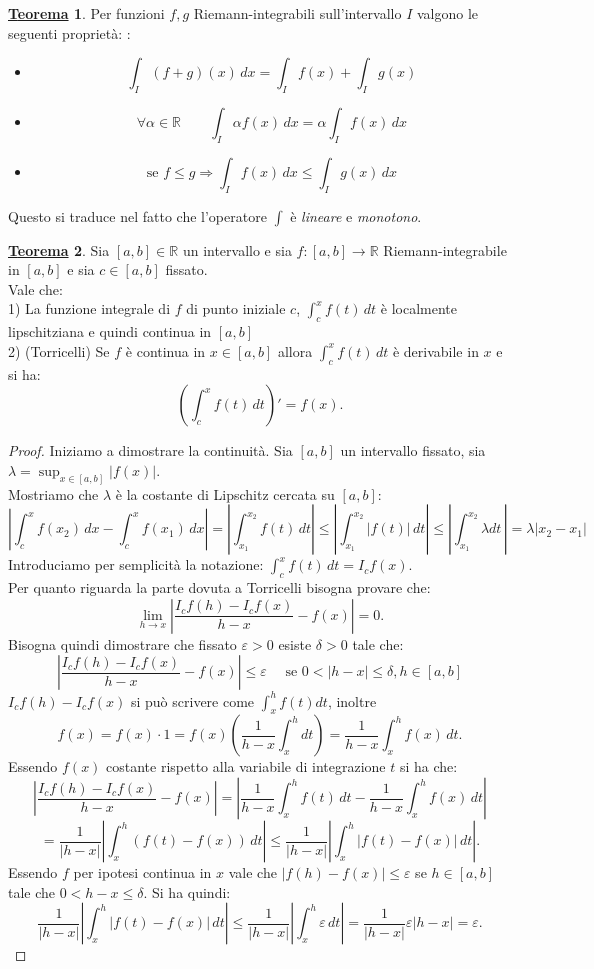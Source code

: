 \documentclass[a4paper,twoside]{article}
\renewcommand{\epsilon}{\varepsilon}
\newcommand{\R}{\mathbb{R}}
\theoremstyle{definition}
\newtheorem{theorem}{\color{Red}\underline{\textrm Teorema}}
\numberwithin{theorem}{section}
\begin{document}
\begin{theorem} 
Per funzioni $f,g$ Riemann-integrabili sull'intervallo $I$ valgono le seguenti proprietà:
:
\begin{itemize}
    \item $$\int_{I} (f+g)(x)\,dx = \int_{I} f(x) + \int_{I} g(x)$$
    \item $$\forall\alpha\in\R\qquad \int_{I} \alpha f(x)\,dx =\alpha\int_{I} f(x)\,dx$$
    \item $$\text{se } f\leq g \Rightarrow \int_{I}f(x)\,dx \leq \int_{I}g(x)\,dx$$
\end{itemize}
Questo si traduce nel fatto che l'operatore $\int$ è \emph{lineare} e \emph{monotono}.
\end{theorem}
\begin{theorem}
    Sia $[a,b]\in\R$ un intervallo e sia $f:[a,b]\to\R$ Riemann-integrabile in $[a,b]$ e sia $c\in[a,b]$ fissato.\\ Vale che:\\
    1) La funzione integrale di $f$ di punto iniziale $c$, $\int_c^x f(t)\,dt$ è localmente lipschitziana e quindi continua in $[a,b]$ \\
    2) (Torricelli) Se $f$ è continua in $x\in[a,b]$ allora $\int_c^x f(t)\,dt$ è derivabile in $x$ e si ha: $$\left(\int_c^x f(t)\,dt\right)' =f(x).$$
\end{theorem}
\begin{proof}
    Iniziamo a dimostrare la continuità. Sia $[a,b]$ un intervallo fissato, sia $\lambda=\sup_{x\in[a,b]}|f(x)|$.\\ Mostriamo che $\lambda$ è la costante di Lipschitz cercata su $[a,b]$:
    $$\left|\int_c^xf(x_2)\,dx-\int_c^xf(x_1)\,dx\right|=\left|\int_{x_1}^{x_2}f(t)\,dt\right|\leq\left|\int_{x_1}^{x_2}|f(t)|\,dt\right|\leq\left|\int_{x_1}^{x_2}\lambda dt\,\right|=\lambda|x_2-x_1|$$
    Introduciamo per semplicità la notazione: $\int_c^xf(t)\,dt= I_c f(x).$ \\
    Per quanto riguarda la parte dovuta a Torricelli bisogna provare che: 
    $$\lim_{h\to x}\left|\frac{I_cf(h)-I_cf(x)}{h-x}-f(x)\right|=0.$$
    Bisogna quindi dimostrare che fissato $\epsilon>0$ esiste $\delta>0$ tale che:
    $$\left|\frac{I_cf(h)-I_cf(x)}{h-x}-f(x)\right|\leq\epsilon\quad \text{ se }  0<|h-x|\leq\delta, h\in[a,b]$$
    $I_cf(h)-I_cf(x)$ si può scrivere come $\int_x^hf(t)dt$, inoltre 
    $$f(x)=f(x)\cdot 1 = f(x)\left(\frac{1}{h-x}\int_x^h dt\right)=\frac{1}{h-x}\int_x^h f(x)\,dt.$$
    Essendo $f(x)$ costante rispetto alla variabile di integrazione $t$ si ha che:
    $$\left|\frac{I_cf(h)-I_cf(x)}{h-x}-f(x)\right|=\left|\frac{1}{h-x}\int_x^h f(t)\,dt -\frac{1}{h-x}\int_x^h f(x)\,dt\right|$$
    $$=\frac{1}{|h-x|}\left|\int_x^h(f(t)-f(x))\,dt\right|\leq\frac{1}{|h-x|}\left|\int_x^h|f(t)-f(x)|\,dt\right|.$$
    Essendo $f$ per ipotesi continua in $x$ vale che $|f(h)-f(x)|\leq\epsilon$ se $h\in[a,b]$ tale che $0<h-x\leq\delta$. Si ha quindi:
    $$\frac{1}{|h-x|}\left|\int_x^h|f(t)-f(x)|\,dt\right|\leq\frac{1}{|h-x|}\left|\int_x^h\epsilon\, dt\right|=\frac{1}{|h-x|}\epsilon|h-x|=\epsilon.$$
\end{proof}
\end{document}
